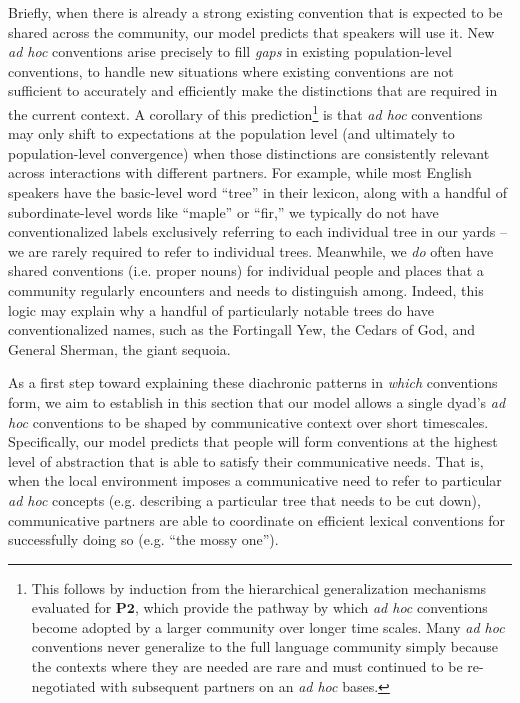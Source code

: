 Briefly, when there is already a strong existing convention that is expected to be shared across the community, our model predicts that speakers will use it. 
New \emph{ad hoc} conventions arise precisely to fill \emph{gaps} in existing population-level conventions, to handle new situations where existing conventions are not sufficient to accurately and efficiently make the distinctions that are required in the current context. 
A corollary of this prediction\footnote{This follows by induction from the hierarchical generalization mechanisms evaluated for $\textbf{P2}$, which provide the pathway by which \emph{ad hoc} conventions become adopted by a larger community over longer time scales. Many \emph{ad hoc} conventions never generalize to the full language community simply because the contexts where they are needed are rare and must continued to be re-negotiated with subsequent partners on an \emph{ad hoc} bases.} is that \emph{ad hoc} conventions may only shift to expectations at the population level (and ultimately to population-level convergence) when those distinctions are consistently relevant across interactions with different partners.
For example, while most English speakers have the basic-level word ``tree'' in their lexicon, along with a handful of subordinate-level words like ``maple'' or ``fir,'' we typically do not have conventionalized labels exclusively referring to each individual tree in our yards -- we are rarely required to refer to individual trees.
Meanwhile, we \emph{do} often have shared conventions (i.e. proper nouns) for individual people and places that a community regularly encounters and needs to distinguish among.
Indeed, this logic may explain why a handful of particularly notable trees do have conventionalized names, such as the Fortingall Yew, the Cedars of God, and General Sherman, the giant sequoia.

As a first step toward explaining these diachronic patterns in \emph{which} conventions form, we aim to establish in this section that our model allows a single dyad's \emph{ad hoc} conventions to be shaped by communicative context over short timescales.
Specifically, our model predicts that people will form conventions at the highest level of abstraction that is able to satisfy their communicative needs.
That is, when the local environment imposes a communicative need to refer to particular \emph{ad hoc} concepts (e.g. describing a particular tree that needs to be cut down), communicative partners are able to coordinate on efficient lexical conventions for successfully doing so (e.g. ``the mossy one'').

